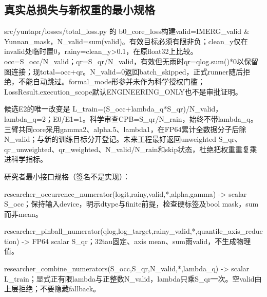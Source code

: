 \documentclass[UTF8,fontset=fandol,10pt]{ctexart}
\begin{document}
\subsection{真实总损失与新权重的最小规格}

src/\allowbreak{}yuntapr/\allowbreak{}losses/\allowbreak{}total\_\allowbreak{}loss.py 的 b0\_\allowbreak{}core\_\allowbreak{}loss构建valid=IMERG\_\allowbreak{}valid \& Yunnan\_\allowbreak{}mask，N\_\allowbreak{}valid=sum(valid)。有效目标必须有限非负；clean\_\allowbreak{}y仅在invalid处临时置0，rainy=clean\_\allowbreak{}y>0.1，在原float32上比较。occ=S\_\allowbreak{}occ/\allowbreak{}N\_\allowbreak{}valid；qr=S\_\allowbreak{}qr/\allowbreak{}N\_\allowbreak{}valid，有效但无雨时qr=qlog.sum()*0以保留图连接；现total=occ+qr。N\_\allowbreak{}valid=0返回batch\_\allowbreak{}skipped，正式runner随后拒绝，不能自动跳过。formal\_\allowbreak{}mode形参并未作为科学授权门槛；LossResult.execution\_\allowbreak{}scope默认ENGINEERING\_\allowbreak{}ONLY也不是审批证明。

候选E2的唯一改变是 L\_\allowbreak{}train=(S\_\allowbreak{}occ+lambda\_\allowbreak{}q*S\_\allowbreak{}qr)/\allowbreak{}N\_\allowbreak{}valid，lambda\_\allowbreak{}q=2；E0/\allowbreak{}E1=1。科学审查CPB=S\_\allowbreak{}qr/\allowbreak{}N\_\allowbreak{}rain，始终不带lambda\_\allowbreak{}q。三臂共同core采用gamma2、alpha.5、lambda1，在FP64累计全数据分子后除N\_\allowbreak{}valid；与新的训练目标分开登记。未来工程最好返回unweighted S\_\allowbreak{}qr、qr\_\allowbreak{}unweighted、qr\_\allowbreak{}weighted、N\_\allowbreak{}valid/\allowbreak{}N\_\allowbreak{}rain和skip状态，杜绝把权重重复乘进科学指标。

研究者最小接口规格（签名不是实现）：

\noindent\textbullet\quad researcher\_\allowbreak{}occurrence\_\allowbreak{}numerator(logit,rainy,valid,*,alpha,gamma) -> scalar S\_\allowbreak{}occ；保持输入device，明示dtype与finite前提，检查硬标签及bool mask，sum而非mean。\par
\noindent\textbullet\quad researcher\_\allowbreak{}pinball\_\allowbreak{}numerator(qlog,log\_\allowbreak{}target,rainy\_\allowbreak{}valid,*,quantile\_\allowbreak{}axis\_\allowbreak{}reduction) -> FP64 scalar S\_\allowbreak{}qr；32tau固定、axis mean、sum雨valid，不生成物理值。\par
\noindent\textbullet\quad researcher\_\allowbreak{}combine\_\allowbreak{}numerators(S\_\allowbreak{}occ,S\_\allowbreak{}qr,N\_\allowbreak{}valid,*,lambda\_\allowbreak{}q) -> scalar L\_\allowbreak{}train；显式正有限lambda与正整数N\_\allowbreak{}valid，lambda只乘S\_\allowbreak{}qr一次。空valid由上层拒绝；不要隐藏fallback。\par
\end{document}

